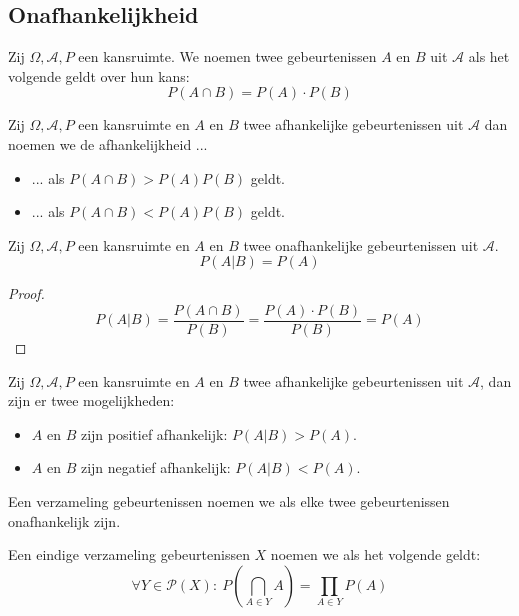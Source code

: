 \documentclass[main.tex]{subfiles}
\begin{document}
\subsection{Onafhankelijkheid}
\label{sec:onafhankelijkheid}
\begin{de}
  Zij $\Omega,\mathcal{A},P$ een kansruimte.
  We noemen twee gebeurtenissen $A$ en $B$ uit $\mathcal{A}$  als het volgende geldt over hun kans:
  \[ P(A\cap B) = P(A) \cdot P(B) \]
\end{de}

\begin{de}
  Zij $\Omega,\mathcal{A},P$ een kansruimte en $A$ en $B$ twee afhankelijke gebeurtenissen uit $\mathcal{A}$ dan noemen we de afhankelijkheid ...
  \begin{itemize}
  \item ...  als $P(A \cap B) > P(A)P(B)$ geldt.
  \item ...  als $P(A \cap B) < P(A)P(B)$ geldt.
  \end{itemize}
\end{de}

\begin{st}
  Zij $\Omega,\mathcal{A},P$ een kansruimte en $A$ en $B$ twee onafhankelijke gebeurtenissen uit $\mathcal{A}$.
  \[ P(A|B) = P(A) \]
  
  \begin{proof}
    \[ P(A|B) = \frac{P(A \cap B)}{P(B)} = \frac{P(A) \cdot P(B)}{P(B)} = P(A) \]
  \end{proof}
\end{st}

\begin{st}
  Zij $\Omega,\mathcal{A},P$ een kansruimte en $A$ en $B$ twee afhankelijke gebeurtenissen uit $\mathcal{A}$, dan zijn er twee mogelijkheden:
  \begin{itemize}
  \item $A$ en $B$ zijn positief afhankelijk: $P(A|B) > P(A)$.
  \item $A$ en $B$ zijn negatief afhankelijk: $P(A|B) < P(A)$.
  \end{itemize}
\end{st}

\begin{de}
  Een verzameling gebeurtenissen noemen we  als elke twee gebeurtenissen onafhankelijk zijn.
\end{de}

\begin{de}
  Een eindige verzameling gebeurtenissen $X$ noemen we  als het volgende geldt:
  \[ \forall Y\in \mathcal{P}(X):\ P\left( \bigcap_{A\in Y}A \right) = \prod_{A\in Y}P(A) \]
\end{de}
\end{document}
